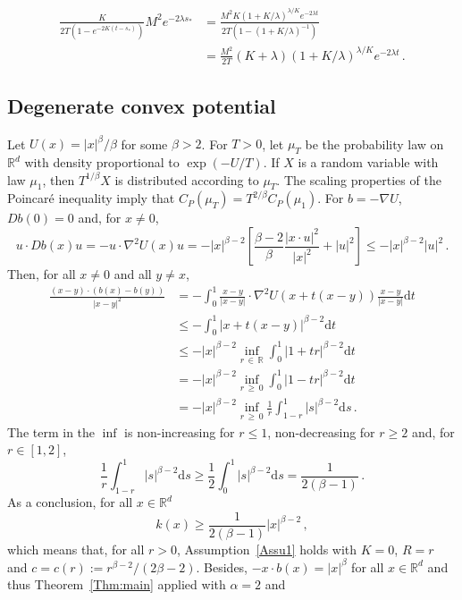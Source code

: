\documentclass[AHL,Unicode,longabstracts,published]{cedram}
\newcommand{\R}{\mathbb R}
\newcommand{\dd}{\mathrm{d}}
\newcommand{\na}{\nabla}
\newcommand{\1}{\mathbbm{1}}
\newcommand{\nv}[1]{#1}
\newcommand{\R}{\mathbb R}
\begin{document}
\begin{align*}
\frac{K}{2T(1-e^{-2K(t-s_*)})} M^2 e^{-2\lambda s_*} &= \frac{M^2 K \left( 1+K/\lambda\right)^{\lambda/K}e^{-2\lambda t} }{2T\left( 1-(1+K/\lambda)^{-1}\right) } \\
&= \frac{M^2}{2T} (K+\lambda) \left( 1+K/\lambda\right)^{\lambda/K}e^{-2\lambda t}\,.
\end{align*}



\subsection{Degenerate convex potential}\label{Sec:convexDegenere}



Let $U(x) = |x|^\beta/\beta$ for some $\beta>2$. For $T>0$, let $\mu_T$ be the probability law on $\R^d$ with density proportional to $\exp(-U/T)$. If $X$ is a random variable with law $\mu_1$, then $T^{1/\beta}X$ is distributed according to $\mu_T$. The scaling properties of the Poincaré inequality \nv{imply} that $C_P(\mu_T)= T^{2/\beta} C_P(\mu_1)$. For $b = -\na U$, $\nv{D b}(0)=0$ and, for $x\neq 0$,
\[
u\cdot \nv{D b}(x) u = -u\cdot \na^2 U(x) u = -|x|^{\beta-2} \left[ \frac{\beta-2}\beta \frac{|x\cdot u|^2}{|x|^2} + |u|^2 \right] \leqslant - |x|^{\beta-2} |u|^2\,.
\]
Then, for all $x\neq 0$ and all $y\neq x$,
\begin{align*}
\frac{(x-y)\cdot \left( b(x)-b(y)\right) }{|x-y|^2} &= -\int_0^1 \frac{x-y}{|x-y|} \cdot \na^2U(x+t(x-y)) \frac{x-y}{|x-y|} \dd t\\
& \leqslant - \int_0^1 |x+t(x-y)|^{\beta-2} \dd t\\
&\leqslant - |x|^{\beta-2} \inf_{\nv{r}\,\in\,\R } \int_0^1 |1+t\nv{r}|^{\beta-2} \dd t\\
& = - |x|^{\beta-2} \inf_{\nv{r}\,\geqslant\,0} \int_0^1 |1-t\nv{r}|^{\beta-2} \dd t\\
& = - |x|^{\beta-2} \inf_{\nv{r}\,\geqslant\,0} \frac1{\nv{r}} \int_{1-\nv{r}}^1 |s|^{\beta-2} \dd s\,.
\end{align*}
The term in the $\inf$ is non-increasing for $\nv{r}\leqslant 1$, non-decreasing for $\nv{r}\geqslant 2$ and, for $\nv{r}\in[1,2]$,
\[
\frac1{\nv{r}}\int_{1-\nv{r}}^1 |s|^{\beta-2} \dd s \geqslant \frac12 \int_0^1 |s|^{\beta-2} \dd s = \frac{1}{2(\beta-1)} \,.
\]
As a conclusion, for all $x\in\R^d$
\[
k(x) \geqslant \frac{1}{2(\beta-1)} |x|^{\beta-2}\,,
\]
which means that, for all $r>0$, Assumption~\ref{Assu1} holds with $K=0$, $R=r$ and $c=c(r):= r^{\beta-2}/(2\beta-2)$. Besides, $-x\cdot b(x) = |x|^\beta $ for all $x\in\R^d$ and thus Theorem~\ref{Thm:main} applied with $\alpha=2$ and
\end{document}

